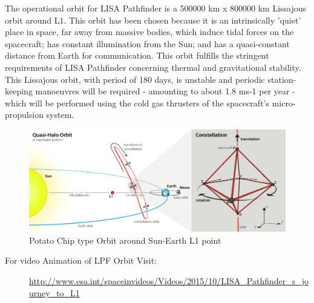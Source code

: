 \documentclass[11pt,fleqn]{book} %
\begin{document}
The operational orbit for LISA Pathfinder is a 500000 km x 800000 km Lissajous orbit around L1. This orbit has been chosen because it is an intrinsically 'quiet' place in space, far away from massive bodies, which induce tidal forces on the spacecraft; has constant illumination from the Sun; and has a quasi-constant distance from Earth for communication. This orbit fulfills the stringent requirements of LISA Pathfinder concerning thermal and gravitational stability.
This Lissajous orbit, with period of 180 days, is unstable and periodic station-keeping manoeuvres will be required - amounting to about 1.8 ms-1 per year - which will be performed using the cold gas thrusters of the spacecraft's micro-propulsion system.
\begin{figure}[h]
	\centering
    \includegraphics[width=1.0\textwidth]{L1_Orbit.png}
    \caption{Potato Chip type Orbit around Sun-Earth L1 point}
\end{figure}
\linebreak
For video Animation of LPF Orbit Visit:
\begin{description}    	  	  \item[]\url{http://www.esa.int/spaceinvideos/Videos/2015/10/LISA_Pathfinder_s_journey_to_L1}
\end{description}
\end{document}
